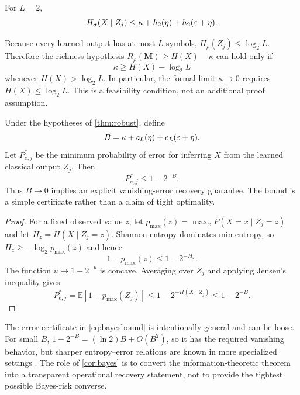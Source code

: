 \begin{corollary}
For $L=2$,
\begin{equation}
H_\sigma(X\mid Z_j)\le\kappa+h_2(\eta)+h_2(\varepsilon+\eta).
\end{equation}
\end{corollary}

\begin{remark}
Because every learned output has at most $L$ symbols, $H_\rho(Z_j)\le\log_2L$. Therefore the richness hypothesis $R_\rho(\mathbf M)\ge H(X)-\kappa$ can hold only if
\[
\kappa\ge H(X)-\log_2L
\]
whenever $H(X)>\log_2L$. In particular, the formal limit $\kappa\to0$ requires $H(X)\le\log_2L$. This is a feasibility condition, not an additional proof assumption.
\end{remark}

\begin{corollary}
\label{cor:bayes}
Under the hypotheses of \cref{thm:robust}, define
\[
B=\kappa+c_L(\eta)+c_L(\varepsilon+\eta).
\]
Let $P_{e,j}^*$ be the minimum probability of error for inferring $X$ from the learned classical output $Z_j$. Then
\begin{equation}
P_{e,j}^*\le 1-2^{-B}.
\label{eq:bayesbound}
\end{equation}
Thus $B\to0$ implies an explicit vanishing-error recovery guarantee. The bound is a simple certificate rather than a claim of tight optimality.
\end{corollary}

\begin{proof}
For a fixed observed value $z$, let $p_{\max}(z)=\max_xP(X=x\mid Z_j=z)$ and let $H_z=H(X\mid Z_j=z)$. Shannon entropy dominates min-entropy, so $H_z\ge-\log_2p_{\max}(z)$ and hence
\[
1-p_{\max}(z)\le1-2^{-H_z}.
\]
The function $u\mapsto1-2^{-u}$ is concave. Averaging over $Z_j$ and applying Jensen's inequality gives
\[
P_{e,j}^*=\mathbb E[1-p_{\max}(Z_j)]
\le1-2^{-H(X\mid Z_j)}
\le1-2^{-B}.
\]
\end{proof}

\begin{remark}
The error certificate in \cref{eq:bayesbound} is intentionally general and can be loose. For small $B$, $1-2^{-B}=(\ln 2)B+O(B^2)$, so it has the required vanishing behavior, but sharper entropy--error relations are known in more specialized settings \cite{konig2009,hu2012}. The role of \cref{cor:bayes} is to convert the information-theoretic theorem into a transparent operational recovery statement, not to provide the tightest possible Bayes-risk converse.
\end{remark}

